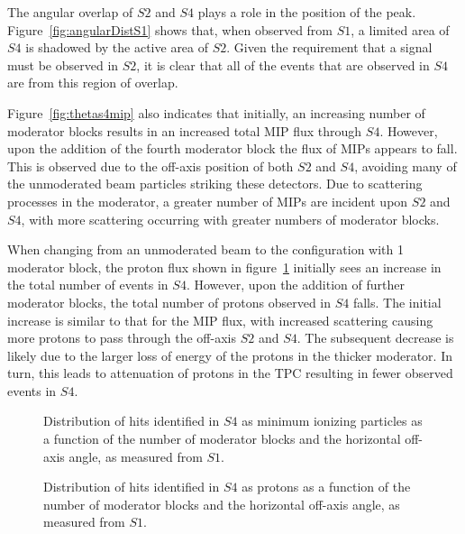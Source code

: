 The angular overlap of $\mathit{S2}$ and $\mathit{S4}$ plays a role in the position of the peak. 
Figure~\ref{fig:angularDistS1} shows that, when observed from $\mathit{S1}$, a limited area of $\mathit{S4}$ is shadowed by the active area of $\mathit{S2}$.
Given the requirement that a signal must be observed in $\mathit{S2}$, it is clear that all of the events that are observed in $\mathit{S4}$ are from this region of overlap.

Figure~\ref{fig:thetas4mip} also indicates that initially, an increasing number of moderator blocks results in an increased total MIP flux through $\mathit{S4}$. 
However, upon the addition of the fourth moderator block the flux of MIPs appears to fall.
This is observed due to the off-axis position of both $\mathit{S2}$ and $\mathit{S4}$, avoiding many of the unmoderated beam particles striking these detectors.
Due to scattering processes in the moderator, a greater number of MIPs are incident upon $\mathit{S2}$ and $\mathit{S4}$, with more scattering occurring with greater numbers of moderator blocks.

When changing from an unmoderated beam to the configuration with 1 moderator block, the proton flux shown in figure~\ref{fig:thetas4pro} initially sees an increase in the total number of events in $\mathit{S4}$.
However, upon the addition of further moderator blocks, the total number of protons observed in $\mathit{S4}$ falls.
The initial increase is similar to that for the MIP flux, with increased scattering causing more protons to pass through the off-axis $\mathit{S2}$ and $\mathit{S4}$.
The subsequent decrease is likely due to the larger loss of energy of the protons in the thicker moderator.
In turn, this leads to attenuation of protons in the TPC resulting in fewer observed events in $\mathit{S4}$.

\begin{figure}[!ht]
  \begin{minipage}[t]{0.48\textwidth}
    \begin{adjustbox}{max totalsize={\textwidth}{.35\textheight},center}
      
    \end{adjustbox}
    \caption{Distribution of hits identified in $\mathit{S4}$ as minimum ionizing particles as a function of the number of moderator blocks and the horizontal off-axis angle, as measured from $\mathit{S1}$.}
    \label{fig:thetas4mip}
  \end{minipage}
  \hspace{0.3cm}
  \begin{minipage}[t]{0.48\textwidth}
    \begin{adjustbox}{max totalsize={\textwidth}{.35\textheight},center}
      
    \end{adjustbox}
    \caption{Distribution of hits identified in $\mathit{S4}$ as protons as a function of the number of moderator blocks and the horizontal off-axis angle, as measured from $\mathit{S1}$.}
    \label{fig:thetas4pro}
  \end{minipage} 
\end{figure}	

